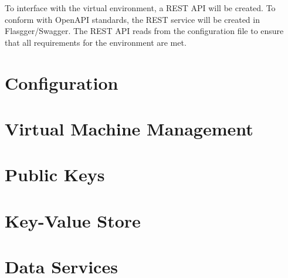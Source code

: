 To interface with the virtual environment, a REST API will be created. To
conform with OpenAPI standards, the REST service will be created in
Flasgger/Swagger. The REST API reads from the configuration file to ensure
that all requirements for the environment are met.


\section{Configuration}

\section{Virtual Machine Management}

\section{Public Keys}

\section{Key-Value Store}

\section{Data Services}





